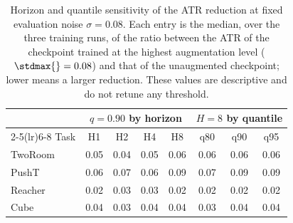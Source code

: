 \begin{table}[H]
\centering
\caption{Horizon and quantile sensitivity of the ATR reduction at fixed evaluation noise $\sigma=0.08$. Each entry is the median, over the three training runs, of the ratio between the ATR of the checkpoint trained at the highest augmentation level ($\stdmax{}=0.08$) and that of the unaugmented checkpoint; lower means a larger reduction. These values are descriptive and do not retune any threshold.}
\label{tab:horizon-quantile-sensitivity}
\small
\setlength{\tabcolsep}{5pt}
\begin{tabular}{lccccccc}
\toprule
& \multicolumn{4}{c}{$q=0.90$ by horizon} & \multicolumn{3}{c}{$H=8$ by quantile} \\
\cmidrule(lr){2-5}\cmidrule(lr){6-8}
Task & H1 & H2 & H4 & H8 & q80 & q90 & q95 \\
\midrule
TwoRoom & 0.05 & 0.04 & 0.05 & 0.06 & 0.06 & 0.06 & 0.06 \\
PushT & 0.06 & 0.07 & 0.06 & 0.09 & 0.07 & 0.09 & 0.09 \\
Reacher & 0.02 & 0.03 & 0.03 & 0.02 & 0.02 & 0.02 & 0.02 \\
Cube & 0.04 & 0.03 & 0.04 & 0.04 & 0.03 & 0.04 & 0.04 \\
\bottomrule
\end{tabular}
\end{table}
